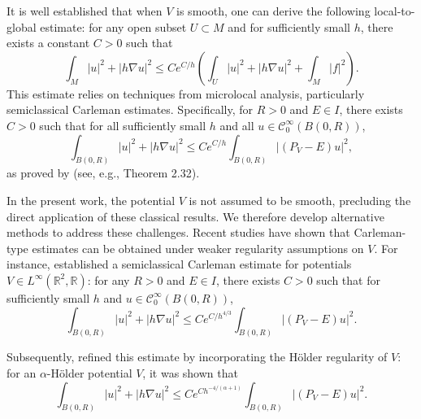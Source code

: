 \documentclass[leqno,11pt,letterpaper, english]{amsart}
\theoremstyle{plain}
\theoremstyle{definition}
\numberwithin{equation}{section}
\begin{document}
It is well established that when \( V \) is smooth, one can derive 
the following local-to-global estimate: for any open subset \( U \subset M \) and for sufficiently small \( h \), there exists a constant \( C > 0 \) such that
\begin{equation}
    \int_M |u|^2 + |h\nabla u|^2 \leq C e^{C/h} \left( \int_U |u|^2 + |h\nabla u|^2 + \int_M |f|^2 \right).
\end{equation}
This estimate relies on techniques from microlocal analysis, particularly semiclassical Carleman estimates. Specifically, for \( R > 0 \) and \( E \in I \), there exists \( C > 0 \) such that for all sufficiently small \( h \) and all \( u \in \mathcal{C}_0^\infty(B(0, R)) \),
\begin{equation}
    \int_{B(0, R)} |u|^2 + |h\nabla u|^2 \leq C e^{C/h} \int_{B(0, R)} |(P_V - E)u|^2,
\end{equation}
as proved by \cite{dyatlovMathematicalTheoryScattering2019} (see, e.g., Theorem 2.32). 

In the present work, the potential \( V \) is not assumed to be smooth, precluding 
the direct application of these classical results. We therefore develop alternative methods to address these challenges. Recent studies have shown that Carleman-type estimates can be obtained under weaker regularity assumptions on \( V \). For instance, \cite{kloppSemiclassicalResolventEstimates2019a} established a semiclassical Carleman estimate for potentials \( V \in L^\infty(\mathbb{R}^2, \mathbb{R}) \): for any \( R > 0 \) and \( E \in I \), there exists \( C > 0 \) such that for sufficiently small \( h \) and \( u \in \mathcal{C}_0^\infty(B(0, R)) \),
\begin{equation}
    \int_{B(0, R)} |u|^2 + |h\nabla u|^2 \leq C e^{C/h^{4/3}} \int_{B(0, R)} |(P_V - E)u|^2.
\end{equation}

Subsequently, 
\cite{vodevSemiclassicalResolventEstimates2020} refined this estimate by incorporating the H\"older regularity of \( V \): for an \( \alpha \)-H\"older potential \( V \), it was shown that
\begin{equation}
    \int_{B(0, R)} |u|^2 + |h\nabla u|^2 \leq C e^{C h^{-4/(\alpha+1)}} \int_{B(0, R)} |(P_V - E)u|^2.
\end{equation}
\end{document}
